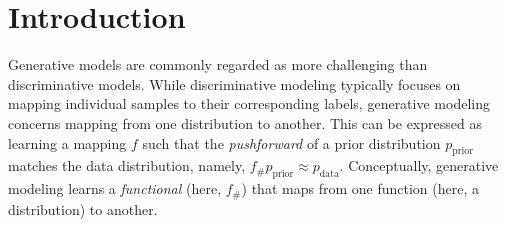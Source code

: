 \documentclass{article}
\def\onedot{.}
\def\eg{\emph{e.g}\onedot} \def\Eg{\emph{E.g}\onedot}
\theoremstyle{plain}
\theoremstyle{definition}
\theoremstyle{remark}
\begin{document}


\printAffiliationsAndNotice{}  %


\begin{abstract}
Generative modeling can be formulated as learning a mapping $f$ such that its pushforward distribution matches the data distribution.
The pushforward behavior can be carried out iteratively at inference time, \eg, in diffusion/flow-based models.
In this paper, we propose a new paradigm called \textit{Drifting Models}, which evolve the pushforward distribution during training and naturally admit one-step inference.
We introduce a drifting field that governs the sample movement and achieves equilibrium when the distributions match.
This leads to a training objective that allows the neural network optimizer to evolve the distribution.
In experiments, our one-step generator achieves state-of-the-art results on ImageNet 256$\times$256, with FID 1.54 in latent space and 1.61 in pixel space.
We hope that our work opens up new opportunities for high-quality one-step generation.
\vspace{-1.5em}
\end{abstract}

\section{Introduction}

Generative models are commonly regarded as more challenging than discriminative models.
While discriminative modeling typically focuses on mapping individual samples to their corresponding labels, generative modeling concerns mapping from one distribution to another.
This can be expressed as learning a mapping $f$ such that the \mbox{\textit{pushforward}} of a prior distribution $p_\text{prior}$ matches the data distribution, namely, $f_\# p_\text{prior} \approx p_{\text{data}}$.
Conceptually, generative modeling learns a \textit{functional} (here, $f_\#$) that maps from one function (here, a distribution) to another.
\end{document}
